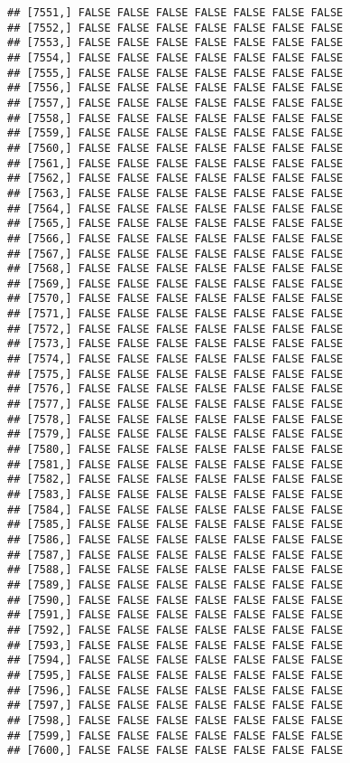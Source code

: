 \documentclass[
]{article}
\begin{document}
\begin{verbatim}
## [7551,] FALSE FALSE FALSE FALSE FALSE FALSE FALSE
## [7552,] FALSE FALSE FALSE FALSE FALSE FALSE FALSE
## [7553,] FALSE FALSE FALSE FALSE FALSE FALSE FALSE
## [7554,] FALSE FALSE FALSE FALSE FALSE FALSE FALSE
## [7555,] FALSE FALSE FALSE FALSE FALSE FALSE FALSE
## [7556,] FALSE FALSE FALSE FALSE FALSE FALSE FALSE
## [7557,] FALSE FALSE FALSE FALSE FALSE FALSE FALSE
## [7558,] FALSE FALSE FALSE FALSE FALSE FALSE FALSE
## [7559,] FALSE FALSE FALSE FALSE FALSE FALSE FALSE
## [7560,] FALSE FALSE FALSE FALSE FALSE FALSE FALSE
## [7561,] FALSE FALSE FALSE FALSE FALSE FALSE FALSE
## [7562,] FALSE FALSE FALSE FALSE FALSE FALSE FALSE
## [7563,] FALSE FALSE FALSE FALSE FALSE FALSE FALSE
## [7564,] FALSE FALSE FALSE FALSE FALSE FALSE FALSE
## [7565,] FALSE FALSE FALSE FALSE FALSE FALSE FALSE
## [7566,] FALSE FALSE FALSE FALSE FALSE FALSE FALSE
## [7567,] FALSE FALSE FALSE FALSE FALSE FALSE FALSE
## [7568,] FALSE FALSE FALSE FALSE FALSE FALSE FALSE
## [7569,] FALSE FALSE FALSE FALSE FALSE FALSE FALSE
## [7570,] FALSE FALSE FALSE FALSE FALSE FALSE FALSE
## [7571,] FALSE FALSE FALSE FALSE FALSE FALSE FALSE
## [7572,] FALSE FALSE FALSE FALSE FALSE FALSE FALSE
## [7573,] FALSE FALSE FALSE FALSE FALSE FALSE FALSE
## [7574,] FALSE FALSE FALSE FALSE FALSE FALSE FALSE
## [7575,] FALSE FALSE FALSE FALSE FALSE FALSE FALSE
## [7576,] FALSE FALSE FALSE FALSE FALSE FALSE FALSE
## [7577,] FALSE FALSE FALSE FALSE FALSE FALSE FALSE
## [7578,] FALSE FALSE FALSE FALSE FALSE FALSE FALSE
## [7579,] FALSE FALSE FALSE FALSE FALSE FALSE FALSE
## [7580,] FALSE FALSE FALSE FALSE FALSE FALSE FALSE
## [7581,] FALSE FALSE FALSE FALSE FALSE FALSE FALSE
## [7582,] FALSE FALSE FALSE FALSE FALSE FALSE FALSE
## [7583,] FALSE FALSE FALSE FALSE FALSE FALSE FALSE
## [7584,] FALSE FALSE FALSE FALSE FALSE FALSE FALSE
## [7585,] FALSE FALSE FALSE FALSE FALSE FALSE FALSE
## [7586,] FALSE FALSE FALSE FALSE FALSE FALSE FALSE
## [7587,] FALSE FALSE FALSE FALSE FALSE FALSE FALSE
## [7588,] FALSE FALSE FALSE FALSE FALSE FALSE FALSE
## [7589,] FALSE FALSE FALSE FALSE FALSE FALSE FALSE
## [7590,] FALSE FALSE FALSE FALSE FALSE FALSE FALSE
## [7591,] FALSE FALSE FALSE FALSE FALSE FALSE FALSE
## [7592,] FALSE FALSE FALSE FALSE FALSE FALSE FALSE
## [7593,] FALSE FALSE FALSE FALSE FALSE FALSE FALSE
## [7594,] FALSE FALSE FALSE FALSE FALSE FALSE FALSE
## [7595,] FALSE FALSE FALSE FALSE FALSE FALSE FALSE
## [7596,] FALSE FALSE FALSE FALSE FALSE FALSE FALSE
## [7597,] FALSE FALSE FALSE FALSE FALSE FALSE FALSE
## [7598,] FALSE FALSE FALSE FALSE FALSE FALSE FALSE
## [7599,] FALSE FALSE FALSE FALSE FALSE FALSE FALSE
## [7600,] FALSE FALSE FALSE FALSE FALSE FALSE FALSE

\end{verbatim}
\end{document}
